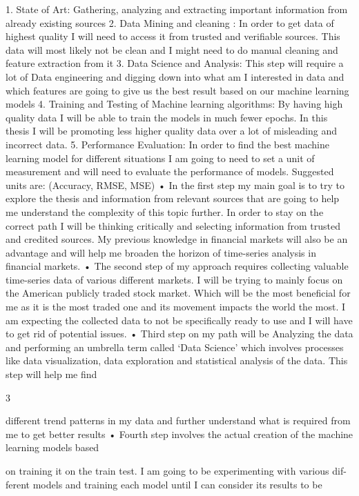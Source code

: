 \documentclass{imc-inf}
\begin{document}
1. State of Art: Gathering, analyzing and extracting important information from
already existing sources
2. Data Mining and cleaning : In order to get data of highest quality I will need
to access it from trusted and verifiable sources. This data will most likely not
be clean and I might need to do manual cleaning and feature extraction from
it
3. Data Science and Analysis: This step will require a lot of Data engineering
and digging down into what am I interested in data and which features are
going to give us the best result based on our machine learning models
4. Training and Testing of Machine learning algorithms: By having high quality
data I will be able to train the models in much fewer epochs. In this thesis I will
be promoting less higher quality data over a lot of misleading and incorrect
data.
5. Performance Evaluation: In order to find the best machine learning model for
different situations I am going to need to set a unit of measurement and will
need to evaluate the performance of models. Suggested units are: (Accuracy,
RMSE, MSE)
• In the first step my main goal is to try to explore the thesis and information
from relevant sources that are going to help me understand the complexity of
this topic further. In order to stay on the correct path I will be thinking critically
and selecting information from trusted and credited sources. My previous
knowledge in financial markets will also be an advantage and will help me
broaden the horizon of time-series analysis in financial markets.
• The second step of my approach requires collecting valuable time-series data
of various different markets. I will be trying to mainly focus on the American
publicly traded stock market. Which will be the most beneficial for me as it
is the most traded one and its movement impacts the world the most. I am
expecting the collected data to not be specifically ready to use and I will have
to get rid of potential issues.
• Third step on my path will be Analyzing the data and performing an umbrella
term called ‘Data Science’ which involves processes like data visualization,
data exploration and statistical analysis of the data. This step will help me find

3

different trend patterns in my data and further understand what is required
from me to get better results
• Fourth step involves the actual creation of the machine learning models based

on training it on the train test. I am going to be experimenting with various dif-
ferent models and training each model until I can consider its results to be
\end{document}
